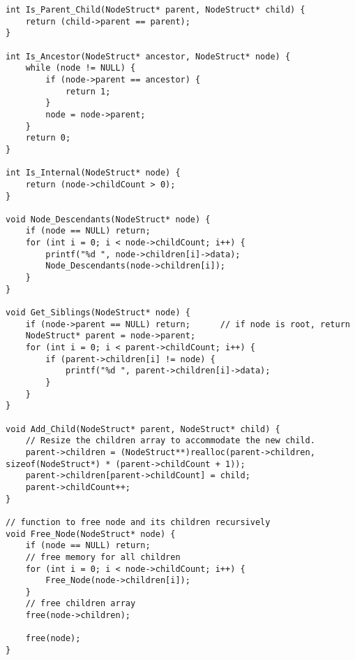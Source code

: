 \documentclass{article}
\begin{document}
\begin{latin}
\begin{lstlisting}[caption={Tree implementation in C language}]
int Is_Parent_Child(NodeStruct* parent, NodeStruct* child) {
	return (child->parent == parent);
}

int Is_Ancestor(NodeStruct* ancestor, NodeStruct* node) {
	while (node != NULL) {
		if (node->parent == ancestor) {
			return 1;
		}
		node = node->parent;
	}
	return 0;
}

int Is_Internal(NodeStruct* node) {
	return (node->childCount > 0);
}

void Node_Descendants(NodeStruct* node) {
	if (node == NULL) return;        
	for (int i = 0; i < node->childCount; i++) {
		printf("%d ", node->children[i]->data);
		Node_Descendants(node->children[i]);
	}
}

void Get_Siblings(NodeStruct* node) {
	if (node->parent == NULL) return;      // if node is root, return
	NodeStruct* parent = node->parent;
	for (int i = 0; i < parent->childCount; i++) {
		if (parent->children[i] != node) {
			printf("%d ", parent->children[i]->data);
		}
	}
}

void Add_Child(NodeStruct* parent, NodeStruct* child) {
	// Resize the children array to accommodate the new child.
	parent->children = (NodeStruct**)realloc(parent->children, sizeof(NodeStruct*) * (parent->childCount + 1));
	parent->children[parent->childCount] = child;
	parent->childCount++;
}

// function to free node and its children recursively 
void Free_Node(NodeStruct* node) {
	if (node == NULL) return;
	// free memory for all children
	for (int i = 0; i < node->childCount; i++) {
		Free_Node(node->children[i]);
	}
	// free children array
	free(node->children);
	
	free(node);
}
\end{lstlisting}
\end{latin}
\end{document}
